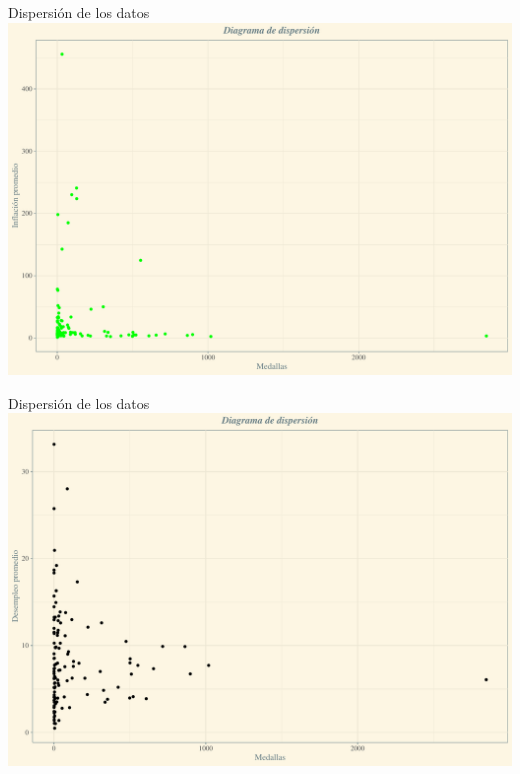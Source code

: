 \documentclass[
  ignorenonframetext,
]{beamer}
\begin{document}
\begin{frame}{Dispersión de los datos}
\protect\hypertarget{dispersiuxf3n-de-los-datos-2}{}
\includegraphics{Presentacion_files/figure-beamer/unnamed-chunk-14-1.pdf}
\end{frame}

\begin{frame}{Dispersión de los datos}
\protect\hypertarget{dispersiuxf3n-de-los-datos-3}{}
\includegraphics{Presentacion_files/figure-beamer/unnamed-chunk-15-1.pdf}
\end{frame}
\end{document}
